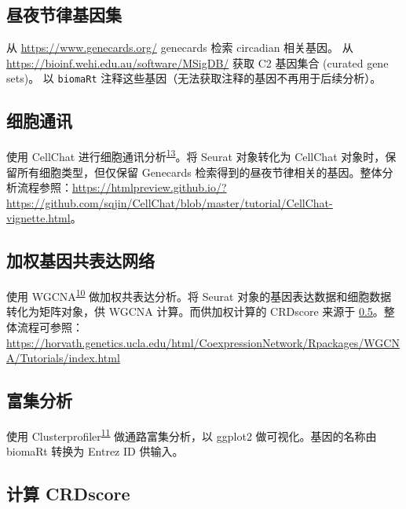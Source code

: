 \documentclass[
]{article}
\begin{document}
\hypertarget{ux663cux591cux8282ux5f8bux57faux56e0ux96c6}{%
\subsection{昼夜节律基因集}\label{ux663cux591cux8282ux5f8bux57faux56e0ux96c6}}

从 \url{https://www.genecards.org/} genecards 检索 circadian 相关基因。
从 \url{https://bioinf.wehi.edu.au/software/MSigDB/} 获取 C2 基因集合 (curated gene sets)。
以 \texttt{biomaRt} 注释这些基因（无法获取注释的基因不再用于后续分析）。

\hypertarget{ux7ec6ux80deux901aux8baf}{%
\subsection{细胞通讯}\label{ux7ec6ux80deux901aux8baf}}

使用 CellChat 进行细胞通讯分析\textsuperscript{\protect\hyperlink{ref-InferenceAndAJinS2021}{13}}。将 Seurat 对象转化为 CellChat 对象时，保留所有细胞类型，但仅保留 Genecards 检索得到的昼夜节律相关的基因。整体分析流程参照：\url{https://htmlpreview.github.io/?https://github.com/sqjin/CellChat/blob/master/tutorial/CellChat-vignette.html}。

\hypertarget{ux52a0ux6743ux57faux56e0ux5171ux8868ux8fbeux7f51ux7edc}{%
\subsection{加权基因共表达网络}\label{ux52a0ux6743ux57faux56e0ux5171ux8868ux8fbeux7f51ux7edc}}

使用 WGCNA\textsuperscript{\protect\hyperlink{ref-WgcnaAnRPacLangfe2008}{10}} 做加权共表达分析。将 Seurat 对象的基因表达数据和细胞数据转化为矩阵对象，供 WGCNA 计算。而供加权计算的 CRDscore 来源于 \ref{crdscore}。整体流程可参照：\url{https://horvath.genetics.ucla.edu/html/CoexpressionNetwork/Rpackages/WGCNA/Tutorials/index.html}

\hypertarget{ux5bccux96c6ux5206ux6790}{%
\subsection{富集分析}\label{ux5bccux96c6ux5206ux6790}}

使用 Clusterprofiler\textsuperscript{\protect\hyperlink{ref-ClusterprofilerWuTi2021}{11}} 做通路富集分析，以 ggplot2 做可视化。基因的名称由 biomaRt 转换为 Entrez ID 供输入。

\hypertarget{crdscore}{%
\subsection{计算 CRDscore}\label{crdscore}}
\end{document}
